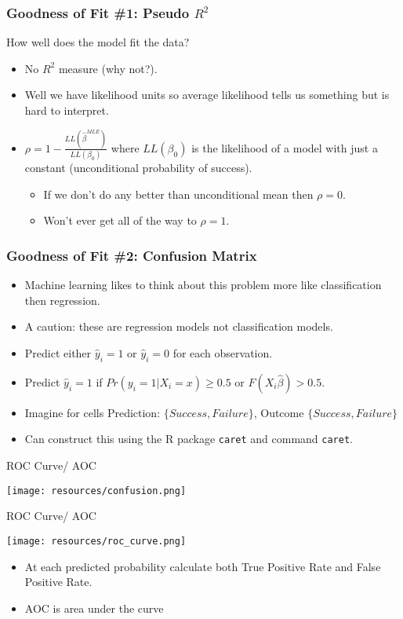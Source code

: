 \documentclass[aspectratio=169]{beamer}
\begin{document}
\begin{frame}
\frametitle{Goodness of Fit \#1: Pseudo $R^2$}
How well does the model fit the data?
\begin{itemize} 
\item No $R^2$ measure (why not?).
\item Well we have likelihood units so average likelihood tells us something but is hard to interpret.
\item $\rho = 1- \frac{LL(\hat{\beta}^{MLE})}{LL(\beta_0)}$ where $LL(\beta_0)$ is the likelihood of a model with just a constant (unconditional probability of success).
\begin{itemize}
\item If we don't do any better than unconditional mean then $\rho=0$.
\item Won't ever get all of the way to $\rho =1$.
\end{itemize}
\end{itemize}
\end{frame}

\begin{frame}
\frametitle{Goodness of Fit \#2: Confusion Matrix }
\begin{itemize} 
\item Machine learning likes to think about this problem more like \alert{classification} then regression.
\item A caution: these are \alert{regression} models not \alert{classification} models.
\item Predict either $\hat{y}_i = 1$ or $\hat{y}_i = 0$ for each observation.
\item Predict $\hat{y}_i =1$ if $Pr(y_i = 1 | X_i =x) \geq0.5$ or $F(X_i \hat{\beta}) > 0.5$.
\item Imagine for cells Prediction: $\{Success, Failure\}$, Outcome $\{Success, Failure\}$
\item Can construct this using the R package \texttt{caret} and command \texttt{caret}.
\end{itemize}
\end{frame}


\begin{frame}{ROC Curve/ AOC}
\begin{center}
\texttt{[image: resources/confusion.png]}\\
\end{center}
\end{frame}



\begin{frame}{ROC Curve/ AOC}
\begin{center}
\texttt{[image: resources/roc\_curve.png]}\\
\end{center}
\begin{itemize}
\item At each predicted probability calculate both \alert{True Positive Rate} and \alert{False Positive Rate}.
\item AOC is area under the curve
\end{itemize}
\end{frame}
\end{document}
